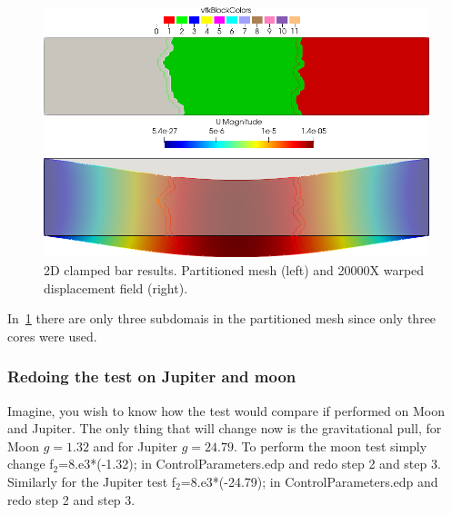 \documentclass{report}
\begin{document}
\begin{figure}[htbp]
    \centering
    \begin{minipage}[t][2cm][t]{0.4\textwidth}
    \includegraphics[align=t,width=1\textwidth]{./Images/2d-bar-partitioned3.png}
    \end{minipage}\hspace{.1\textwidth}
    \begin{minipage}[t][2cm][t]{0.4\textwidth}
    \includegraphics[align=t,width=1\textwidth]{./Images/2d-bar-clamped-ends.png}
    \end{minipage}
    \caption{2D clamped bar results. Partitioned mesh (left) and 20000X warped displacement field (right).}
    \label{fig:3part}
\end{figure}

In~\cref{fig:3part} there are only three subdomais in the partitioned mesh since only three cores were used.

\subsubsection{Redoing the test on Jupiter and moon}

Imagine, you wish to know how the test would compare if performed on Moon and Jupiter. The only thing that will change now is the gravitational pull, for Moon $g=1.32$ and for Jupiter $g=24.79$. To perform the moon test simply change  {\ttfamily f$_2$=8.e3*(-1.32);} in {\ttfamily ControlParameters.edp} and redo step 2 and step 3. Similarly for the Jupiter test {\ttfamily f$_2$=8.e3*(-24.79);} in {\ttfamily ControlParameters.edp} and redo step 2 and step 3.
\end{document}

